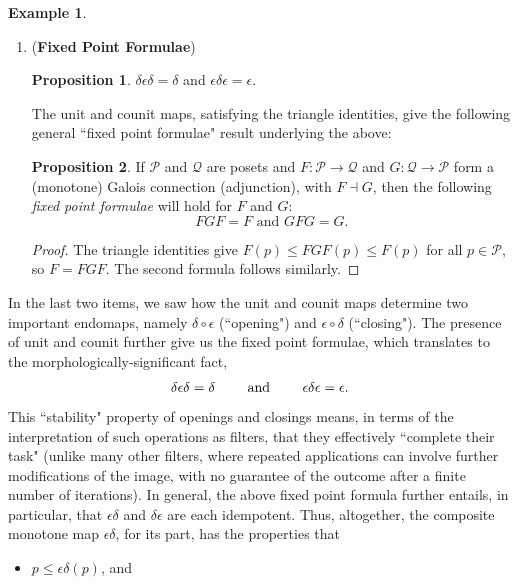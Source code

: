 \documentclass[11pt]{book}
\theoremstyle{definition}
\newtheorem{example}{Example}[section]
\theoremstyle{definition}
\theoremstyle{definition}
\newtheorem{proposition}{Proposition}[section]
\theoremstyle{theorem}
\theoremstyle{definition}
\begin{document}
\begin{example}
\begin{enumerate}
\item (\textbf{Fixed Point Formulae}) 
\begin{proposition} 
	$\delta \epsilon \delta = \delta$ and $\epsilon \delta \epsilon = \epsilon$.
\end{proposition} 
The unit and counit maps, satisfying the triangle identities, give the following general ``fixed point formulae" result underlying the above: 
\begin{proposition}
	If $\mathcal{P}$ and $\mathcal{Q}$ are posets and $F: \mathcal{P} \rightarrow \mathcal{Q}$ and $G: \mathcal{Q} \rightarrow \mathcal{P}$ form a (monotone) Galois connection (adjunction), with $F \dashv G$, then the following \textit{fixed point formulae} will hold for $F$ and $G$: 
	\begin{equation*}
	FGF = F \text{ and } GFG = G.
	\end{equation*}
\end{proposition} 
\begin{proof}
	The triangle identities give $F(p) \leq FGF(p) \leq F(p)$ for all $p \in \mathcal{P}$, so $F = FGF$. The second formula follows similarly. 
\end{proof}
\end{enumerate} 
In the last two items, we saw how the unit and counit maps determine two important endomaps, namely $\delta \circ \epsilon$ (``opening") and $\epsilon \circ \delta$ (``closing"). The presence of unit and counit further give us the fixed point formulae, which translates to the morphologically-significant fact, 
\begin{equation}
\delta \epsilon \delta = \delta \hspace*{2em} \text{ and } \hspace*{2em} \epsilon \delta \epsilon = \epsilon. 
\end{equation} 
This ``stability" property of openings and closings means, in terms of the interpretation of such operations as filters, that they effectively ``complete their task" (unlike many other filters, where repeated applications can involve further modifications of the image, with no guarantee of the outcome after a finite number of iterations). In general, the above fixed point formula further entails, in particular, that $\epsilon \delta$ and $\delta \epsilon$ are each idempotent. Thus, altogether, the composite monotone map $\epsilon \delta$, for its part, has the properties that 
\begin{itemize}
	\item $p \leq \epsilon \delta (p)$, and 

\end{itemize}
\end{example}
\end{document}
